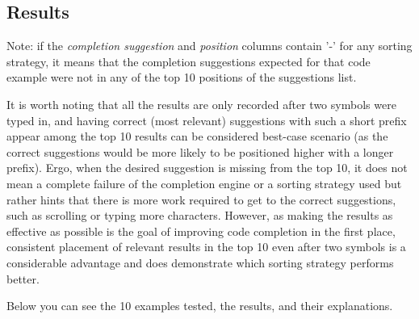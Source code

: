 \subsection{Results}
Note: if the \textit{completion suggestion} and \textit{position} columns contain '-' for any sorting strategy, it means that the completion suggestions expected for that code example were not in any of the top 10 positions of the suggestions list.

It is worth noting that all the results are only recorded after two symbols were typed in, and having correct (most relevant) suggestions with such a short prefix appear among the top 10 results can be considered best-case scenario (as the correct suggestions would be more likely to be positioned higher with a longer prefix). Ergo, when the desired suggestion is missing from the top 10, it does not mean a complete failure of the completion engine or a sorting strategy used but rather hints that there is more work required to get to the correct suggestions, such as scrolling or typing more characters. However, as making the results as effective as possible is the goal of improving code completion in the first place, consistent placement of relevant results in the top 10 even after two symbols is a considerable advantage and does demonstrate which sorting strategy performs better.

Below you can see the 10 examples tested, the results, and their explanations.

